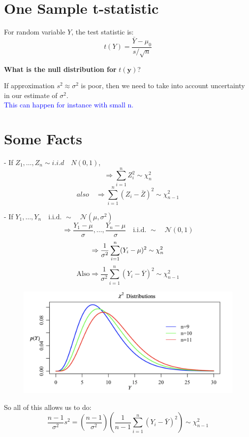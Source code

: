\documentclass[14pt]{extarticle}
\begin{document}
\section*{One Sample t-statistic}
For random variable $Y$, the test statistic is:
\[
t(Y) = \frac{\bar{Y} - \mu_0}{s / \sqrt{n}}
\]

\noindent \textbf{What is the null distribution for} \(t(\mathbf{y})\)?

\noindent If approximation \(s^2 \approx \sigma^2\) is poor, then we need to take into account uncertainty in our estimate of \(\sigma^2\).\\
\noindent\textcolor{blue}{This can happen for instance with small n.}


\section*{Some Facts}
- If \( Z_1, \dots, Z_n \sim i.i.d \quad N(0,1) \),
\[
\Rightarrow \sum_{i=1}^n Z_i^2 \sim \chi_n^2
\]
\[also \quad
\Rightarrow \sum_{i=1}^n (Z_i - \bar{Z})^2 \sim \chi_{n-1}^2
\]

- If $Y_1, \dots, Y_n \quad \text{i.i.d.  } {\sim} \quad \mathcal{N}(\mu, \sigma^2)$
\[
\Rightarrow \frac{Y_1 - \mu}{\sigma}, \dots, \frac{Y_n - \mu}{\sigma} \quad \text{i.i.d.  } {\sim} \quad \mathcal{N}(0,1)
\]
\[
\Rightarrow \frac{1}{\sigma^2} \sum_{i=1}^{n} (Y_i - \mu)^2 \sim \chi_n^2 \\
\]
\[
\text{Also}
\Rightarrow \frac{1}{\sigma^2} \sum_{i=1}^{n} (Y_i - \overline{Y})^2 \sim \chi_{n-1}^2
\]
\begin{figure}[h]
    \centering
    \includegraphics[width=1\textwidth]{fig4.png}
\end{figure}

So all of this allows us to do: 
\[
\frac{n-1}{\sigma^2} s^2 = \left(\frac{n-1}{\sigma^2}\right) \left( \frac{1}{n-1} \sum_{i=1}^n (Y_i - \bar{Y})^2 \right) \sim \chi^2_{n-1}
\]
\end{document}
